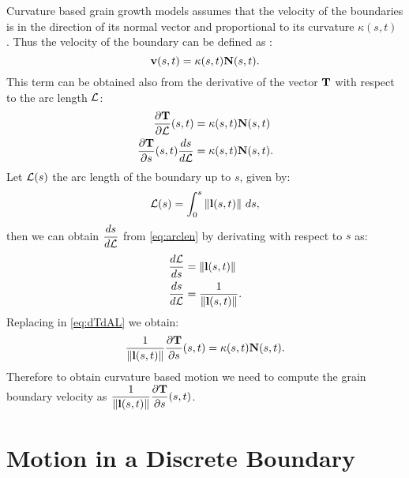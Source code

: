 Curvature based grain growth models assumes that the velocity of the boundaries is in the direction of its normal vector and proportional to its curvature $\kappa(s,t)$ \cite{Kinderlehrer2006}. Thus the velocity of the boundary can be defined as \cite{thomascalculus}:
\begin{equation}
    \vel(s,t) = \kappa(s,t)\N(s,t). %
    \nonumber
\end{equation}
This term can be obtained also from the derivative of the vector $\mathbf{T}$ with respect to the arc length $\mathcal{L}$:
\begin{align}
    \dfrac{\partial \mathbf{T}}{\partial \mathcal{L}}(s,t)  &= \kappa(s,t)\mathbf{N}(s,t) \nonumber\\
    \dfrac{\partial \mathbf{T}}{\partial s}(s,t) \dfrac{ds}{d\mathcal{L}} &=\kappa(s,t)\mathbf{N}(s,t). \label{eq:dTdAL}
\end{align}
Let $\mathcal{L}(s)$ the arc length of the boundary up to $s$, given by:
\begin{equation}
    \mathcal{L}(s) = \int_0^{s} \left\lVert\mathbf{l}(s,t)\right\rVert\, ds,
    \label{eq:arclen}
\end{equation}
then we can obtain $\dfrac{ds}{d\mathcal{L}}$ from \eqref{eq:arclen} by derivating with respect to $s$ as:
\begin{align*}
    \frac{d\mathcal{L}}{ds} &= \left\lVert\mathbf{l}(s,t)\right\rVert \\
    \frac{ds}{d\mathcal{L}} &= \frac{1}{\left\lVert\mathbf{l}(s,t)\right\rVert}.
\end{align*}
Replacing in \eqref{eq:dTdAL} we obtain:
\begin{equation}
    \dfrac{1}{\left\lVert\mathbf{l}(s,t)\right\rVert} \dfrac{\partial \mathbf{T}}{\partial s}(s,t) = \kappa(s,t)\mathbf{N}(s,t).
    \label{eq:curvresult}
\end{equation}
Therefore to obtain curvature based motion we need to compute the grain boundary velocity as $\displaystyle \dfrac{1}{\left\lVert\mathbf{l}(s,t)\right\rVert}\dfrac{\partial \mathbf{T}}{\partial s}(s,t)$.

\section{Motion in a Discrete Boundary}

